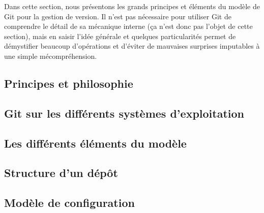 Dans cette section, nous présentons les grands principes et éléments
du modèle de Git pour la gestion de version. Il n'est pas nécessaire
pour utiliser Git de comprendre le détail de sa mécanique interne (ça
n'est donc pas l'objet de cette section), mais en saisir l'idée
générale et quelques particularités permet de démystifier beaucoup
d'opérations et d'éviter de mauvaises surprises imputables à une
simple mécompréhension.

\subsection{Principes et philosophie} %


\subsection{Git sur les différents systèmes d'exploitation}\label{GitOS} %

\subsection{Les différents éléments du modèle} %



\subsection{Structure d'un dépôt} %

\subsection{Modèle de configuration} %
